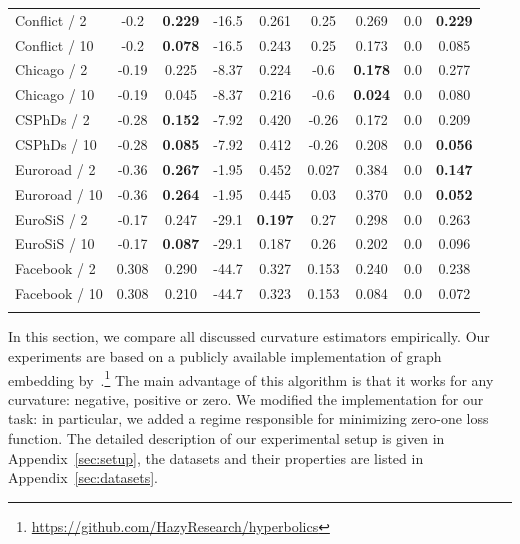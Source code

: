 \documentclass{article} %
\begin{document}
\begin{table}[t]
\begin{center}
\begin{tabular}{lcccccc|cc}
Conflict / 2 &
-0.2 &	\textbf{0.229} &
-16.5 &	0.261 &
0.25 & 	0.269 &
0.0 & \textbf{0.229} \\
Conflict / 10 &
-0.2 & \textbf{0.078} &
-16.5 &	0.243 &
0.25 &	0.173 &
0.0 & 0.085  \\
Chicago / 2 &
-0.19 & 0.225 & 
-8.37 & 0.224 & 
-0.6 & \textbf{0.178} & 
0.0 & 0.277 \\
Chicago / 10 &
-0.19 & 0.045 & 
-8.37 & 0.216 & 
-0.6 & \textbf{0.024} & 
0.0 & 0.080  \\
CSPhDs / 2 &
-0.28 &	\textbf{0.152} &
-7.92 &	0.420 &
-0.26 & 0.172 &
0.0 & 0.209 \\
CSPhDs / 10 &
-0.28 &	\textbf{0.085} &
-7.92 &	0.412 &
-0.26 & 0.208 &
0.0 & \textbf{0.056} \\
Euroroad / 2 &
-0.36 &	\textbf{0.267} &
-1.95 &	0.452&
0.027 &	0.384&
0.0 & \textbf{0.147}\\
Euroroad / 10 &
-0.36 &	\textbf{0.264} &
-1.95 &	0.445 &
0.03 &	0.370 &
0.0 & \textbf{0.052}  \\
EuroSiS / 2 &
-0.17 & 0.247 & 
-29.1 & \textbf{0.197} & 
0.27 & 0.298 & 
0.0 & 0.263 \\
EuroSiS / 10 &
-0.17 & \textbf{0.087} & 
-29.1 & 0.187 & 
0.26 & 0.202 & 
0.0 & 0.096 \\
Facebook / 2 &
0.308 & 0.290 & 
-44.7 & 0.327 & 
0.153 & 0.240 & 
0.0 & 0.238  \\
Facebook / 10 &
0.308 & 0.210 &
-44.7 & 0.323 & 
0.153 & 0.084 & 
0.0 & 0.072 \\
\hline \\
\end{tabular}
\end{center}
\end{table}

In this section, we compare all discussed curvature estimators empirically. Our experiments are based on a publicly available implementation of graph embedding by~\citet{gu2019learning}.\footnote{\url{https://github.com/HazyResearch/hyperbolics}} The main advantage of this algorithm is that it works for any curvature: negative, positive or zero. We modified the implementation for our task: in particular, we added a regime responsible for minimizing zero-one loss function. The detailed description of our experimental setup is given in Appendix~\ref{sec:setup}, the datasets and their properties are listed in Appendix~\ref{sec:datasets}.
\end{document}
